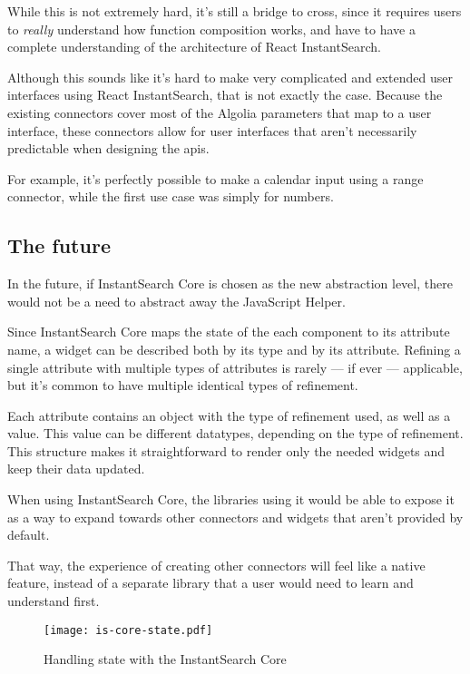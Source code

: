 While this is not extremely hard, it's still a bridge to cross, since it requires users to \emph{really} understand how function composition works, and have to have a complete understanding of the architecture of React InstantSearch.

Although this sounds like it's hard to make very complicated and extended user interfaces using React InstantSearch, that is not exactly the case. Because the existing connectors cover most of the Algolia parameters that map to a user interface, these connectors allow for user interfaces that aren't necessarily predictable when designing the \acrshort{api}s. 

For example, it's perfectly possible to make a calendar input using a range connector, while the first use case was simply for numbers.


\subsection{The future} %
\label{sub:the_future}

In the future, if InstantSearch Core is chosen as the new abstraction level, there would not be a need to abstract away the JavaScript Helper. 

Since InstantSearch Core maps the state of the each component to its \gls{attribute} name, a widget can be described both by its type and by its attribute. Refining a single attribute with multiple types of attributes is rarely --- if ever --- applicable, but it's common to have multiple identical types of refinement.

Each attribute contains an object with the type of refinement used, as well as a value. This value can be different datatypes, depending on the type of refinement. This structure makes it straightforward to render only the needed widgets and keep their data updated.

When using InstantSearch Core, the libraries using it would be able to expose it as a way to expand towards other connectors and widgets that aren't provided by default.

That way, the experience of creating other connectors will feel like a native feature, instead of a separate \gls{library} that a user would need to learn and understand first.

\begin{figure}[H]
  \centering
  \texttt{[image: is-core-state.pdf]}
  \caption{Handling state with the InstantSearch Core}
  \label{figure:is-core-state}
\end{figure}

